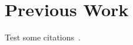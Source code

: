 \section{Previous Work}\label{sec:PreviousWork}
Test some citations~\cite{Alliez03RAC,Peng05T3M,Maglo153MC}.

